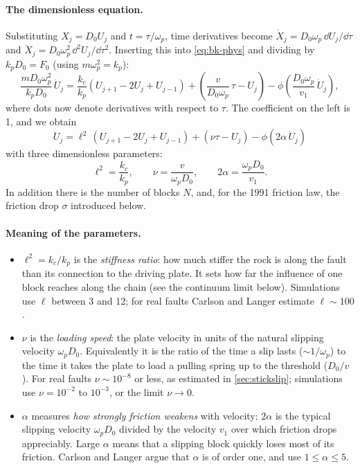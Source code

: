 \paragraph{The dimensionless equation.} Substituting $X_j = D_0 U_j$ and $t=\tau/\omega_p$, time derivatives
become $\dot X_j = D_0\omega_p\,\dd U_j/\dd\tau$ and $\ddot X_j = D_0\omega_p^2\,\dd^2U_j/\dd\tau^2$. Inserting
this into \cref{eq:bk-phys} and dividing by $k_pD_0 = F_0$ (using $m\omega_p^2 = k_p$):
\begin{equation}
  \frac{m D_0\omega_p^2}{k_pD_0}\,\ddot U_j = \frac{k_c}{k_p}(U_{j+1}-2U_j+U_{j-1}) + \left(\frac{v}{D_0\omega_p}\,\tau - U_j\right)
  - \phi\!\left(\frac{D_0\omega_p}{v_1}\,\dot U_j\right),
\end{equation}
where dots now denote derivatives with respect to $\tau$. The coefficient on the left is 1, and we obtain
\begin{equation}
  \boxed{\;\ddot U_j = \ell^2\,(U_{j+1}-2U_j+U_{j-1}) + (\nu\tau - U_j) - \phi(2\alpha\,\dot U_j)\;}
  \label{eq:bk}
\end{equation}
with three dimensionless parameters:
\begin{equation}
  \ell^2 = \frac{k_c}{k_p},\qquad
  \nu = \frac{v}{\omega_pD_0},\qquad
  2\alpha = \frac{\omega_pD_0}{v_1}.
  \label{eq:bk-params}
\end{equation}
In addition there is the number of blocks $N$, and, for the 1991 friction law, the friction drop $\sigma$
introduced below.

\paragraph{Meaning of the parameters.}
\begin{itemize}
  \item $\ell^2 = k_c/k_p$ is the \emph{stiffness ratio}: how much stiffer the rock is along the fault than its
    connection to the driving plate. It sets how far the influence of one block reaches along the chain (see
    the continuum limit below). Simulations use $\ell$ between 3 and 12; for real faults Carlson and Langer
    estimate $\ell\sim100$.
  \item $\nu$ is the \emph{loading speed}: the plate velocity in units of the natural slipping velocity
    $\omega_pD_0$. Equivalently it is the ratio of the time a slip lasts ($\sim1/\omega_p$) to the time it takes the
    plate to load a pulling spring up to the threshold ($D_0/v$). For real faults $\nu\sim10^{-8}$ or less, as
    estimated in \cref{sec:stickslip}; simulations use $\nu = 10^{-2}$ to $10^{-3}$, or the limit $\nu\to0$.
  \item $\alpha$ measures \emph{how strongly friction weakens} with velocity: $2\alpha$ is the typical slipping
    velocity $\omega_pD_0$ divided by the velocity $v_1$ over which friction drops appreciably. Large $\alpha$
    means that a slipping block quickly loses most of its friction. Carlson and Langer argue that $\alpha$ is of
    order one, and use $1\le\alpha\le5$.
\end{itemize}

